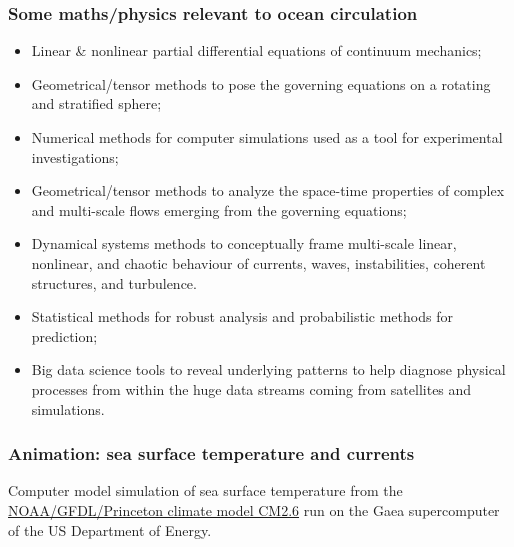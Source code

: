 \documentclass[10pt]{beamer}
\begin{document}
\begin{frame}
  \frametitle{Some maths/physics relevant to ocean circulation}


\begin{exampleblock}{}
\begin{itemize}

\item Linear \& nonlinear partial differential equations of continuum
  mechanics;

\item Geometrical/tensor methods to pose the governing equations on a
  rotating and stratified sphere;

\item Numerical methods for computer simulations used as a tool for
  experimental investigations;

\item Geometrical/tensor methods to analyze the space-time properties
  of complex and multi-scale flows emerging from the governing
  equations;

\item Dynamical systems methods to conceptually frame multi-scale
  linear, nonlinear, and chaotic behaviour of currents, waves,
  instabilities, coherent structures, and turbulence.

\item Statistical methods for robust analysis and probabilistic
  methods for prediction;

\item Big data science tools to reveal underlying patterns to help
  diagnose physical processes from within the huge data streams coming
  from satellites and simulations.


\end{itemize}

\end{exampleblock}{}

\end{frame}


\begin{frame}
  \frametitle{Animation: sea surface temperature and currents}

\begin{center}
\vspace{-.25cm}
\end{center}

\begin{center}
Computer model simulation of sea surface temperature from the
\href{https://vimeo.com/27076776}{NOAA/GFDL/Princeton climate model
  CM2.6} run on the Gaea supercomputer of the US Department of Energy. 
\end{center}

\end{frame}
\end{document}
